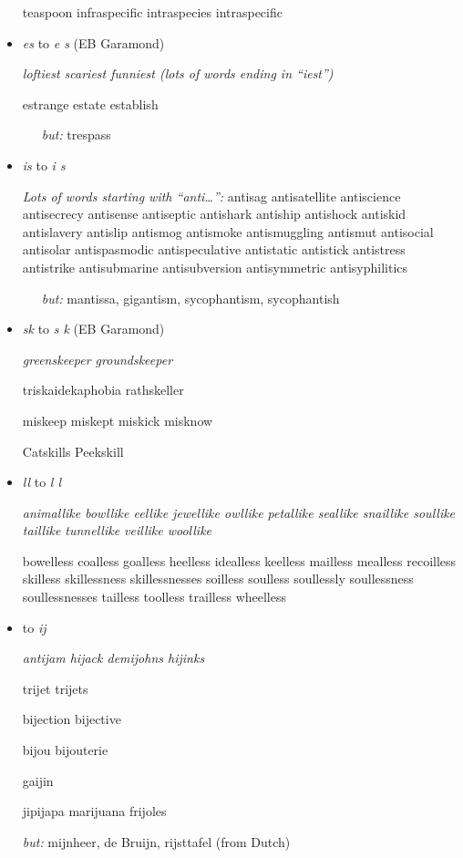 \begin{itemize}
teaspoon infraspecific intraspecies intraspecific

\egroup



\item {\ebg \emph{es} to \emph{e\kern0pt s} (EB Garamond)}

\bgroup \ebg \em
 loftiest scariest funniest \emph{(lots of words ending in ``iest'')}

estrange estate establish 

\ \ \ \emph{but:} trespass 

\egroup



\item \emph{is} to \emph{i\kern0pt s}

\bgroup \em

\emph{Lots of words \emph{starting} with ``anti\dots'':} antisag antisatellite antiscience antisecrecy antisense antiseptic antishark antiship antishock antiskid antislavery antislip antismog antismoke antismuggling antismut antisocial antisolar antispasmodic antispeculative antistatic antistick antistress antistrike antisubmarine antisubversion antisymmetric antisyphilitics 

\ \ \ \emph{but:} mantissa, gigantism, sycophantism, sycophantish

\egroup



\item {\ebg \emph{sk} to \emph{s\kern0pt k} (EB Garamond)}

\bgroup \ebg \em
greenskeeper groundskeeper 

triskaidekaphobia rathskeller

miskeep miskept miskick misknow

Catskills Peekskill

\egroup



\item \emph{ll} to \emph{l\kern0pt l}

\bgroup \em
animallike bowllike eellike jewellike owllike petallike seallike snaillike soullike taillike tunnellike veillike woollike

bowelless coalless goalless heelless idealless keelless mailless mealless recoilless skilless skillessness skillessnesses soilless soulless soullessly soullessness soullessnesses tailless toolless trailless wheelless

\egroup



\item \emph{} to \emph{ij}

\bgroup \em
antijam hijack demijohns hijinks

trijet trijets

bijection bijective 

bijou bijouterie 

gaijin

jipijapa marijuana frijoles 

\emph{but:} mijnheer, de Bruijn, rijsttafel (from Dutch)

\egroup

\end{itemize}
